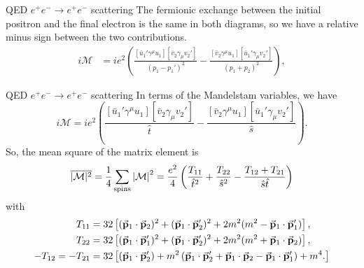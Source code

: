 \documentclass{../bredelebeamer}
\begin{document}
\begin{frame}{QED $e^+e^- \longrightarrow e^+e^-$ scattering}
    The fermionic exchange between the initial positron and the final electron is the same in both diagrams, so we have a relative minus sign between the two contributions.
    \begin{align}
        i\mathcal{M} & = ie^2 \left(
        \frac{
                \left[\bar u_1' \gamma^\mu u_1\right]\left[\bar v_2 \gamma_\mu v_2'\right]
            }{(p_1 - p_1')^2}
        -
        \frac{
                \left[\bar v_2 \gamma^\mu u_1\right]\left[\bar u_1' \gamma_\mu v_2'\right]
            }{(p_1 + p_2)^2}
        \right),
    \end{align}
\end{frame}
\begin{frame}{QED $e^+e^- \longrightarrow e^+e^-$ scattering}
    In terms of the Mandelstam variables, we have
    \begin{equation}
        i \mathcal{M}
        = ie^2 \left(
        \frac{
            \left[\bar u_1' \gamma^\mu u_1\right]\left[\bar v_2 \gamma_\mu v_2'\right]
        }{\hat t}
        -
        \frac{
            \left[\bar v_2 \gamma^\mu u_1\right]\left[\bar u_1' \gamma_\mu v_2'\right]
        }{\hat s}
        \right).
    \end{equation}
    So, the mean square of the matrix element is
    \begin{equation}
        \overline{|\mathcal{M}|^2} =\frac{1}{4}\sum_{\text{spins}} \abs{\mathcal M}^2= \frac{e^2}{4} \left(
        \frac{T_{11}}{\hat t^2}
        + \frac{T_{22}}{\hat s^2}
        - \frac{T_{12}+T_{21}}{\hat s\hat t}
        \right)
    \end{equation}
    with
    \begin{align}
        T_{11}            & = 32\left[ (\va{p}_1\cdot \va{p}_2)^2 + (\va{p}_1\cdot \va{p}_2')^2 + 2m^2(m^2 - \va{p}_1\cdot \va{p}_1') \right],
        \\
        T_{22}            & = 32\left[ (\va{p}_1\cdot \va{p}_1')^2 + (\va{p}_1\cdot \va{p}_2')^2 + 2m^2(m^2 + \va{p}_1\cdot \va{p}_2) \right],
        \\
        -T_{12} = -T_{21} & = 32 \left[
            (\va{p}_1\cdot \va{p}_2') +m^2\left(
            \va{p}_1\cdot \va{p}_2' + \va{p}_1\cdot \va{p}_2 - \va{p}_1\cdot \va{p}_1'
            \right)
            +m^4.
            \right]
    \end{align}
\end{frame}
\end{document}
